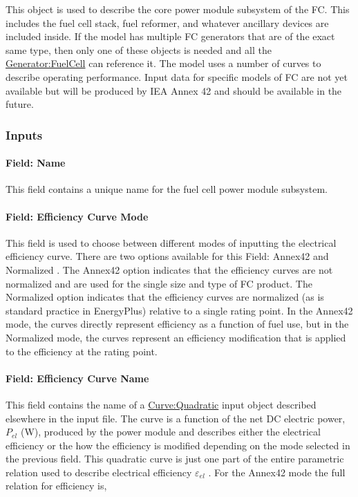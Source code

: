 This object is used to describe the core power module subsystem of the FC. This includes the fuel cell stack, fuel reformer, and whatever ancillary devices are included inside. If the model has multiple FC generators that are of the exact same type, then only one of these objects is needed and all the \hyperref[generatorfuelcell]{Generator:FuelCell} can reference it. The model uses a number of curves to describe operating performance. Input data for specific models of FC are not yet available but will be produced by IEA Annex 42 and should be available in the future.

\subsubsection{Inputs}\label{inputs-13-003}

\paragraph{Field: Name}\label{field-name-14-001}

This field contains a unique name for the fuel cell power module subsystem.

\paragraph{Field: Efficiency Curve Mode}\label{field-efficiency-curve-mode}

This field is used to choose between different modes of inputting the electrical efficiency curve. There are two options available for this Field: Annex42 and Normalized . The Annex42 option indicates that the efficiency curves are not normalized and are used for the single size and type of FC product. The Normalized option indicates that the efficiency curves are normalized (as is standard practice in EnergyPlus) relative to a single rating point. In the Annex42 mode, the curves directly represent efficiency as a function of fuel use, but in the Normalized mode, the curves represent an efficiency modification that is applied to the efficiency at the rating point.

\paragraph{Field: Efficiency Curve Name}\label{field-efficiency-curve-name}

This field contains the name of a \hyperref[curvequadratic]{Curve:Quadratic} input object described elsewhere in the input file. The curve is a function of the net DC electric power, \({P_{el}}\) (W), produced by the power module and describes either the electrical efficiency or the how the efficiency is modified depending on the mode selected in the previous field. This quadratic curve is just one part of the entire parametric relation used to describe electrical efficiency \({\varepsilon_{el}}\) . For the Annex42 mode the full relation for efficiency is,

